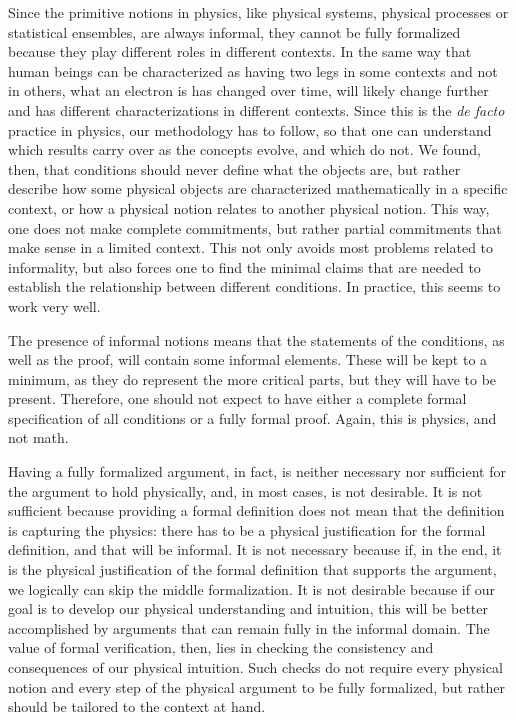 \documentclass[entropy,article,submit,moreauthors]{Definitions/mdpi}
\begin{document}
Since the primitive notions in physics, like physical systems, physical processes or statistical ensembles, are always informal, they cannot be fully formalized because they play different roles in different contexts. In the same way that human beings can be characterized as having two legs in some contexts and not in others, what an electron is has changed over time, will likely change further and has different characterizations in different contexts. Since this is the \textit{de facto} practice in physics, our methodology has to follow, so that one can understand which results carry over as the concepts evolve, and which do not. We found, then, that conditions should never define what the objects are, but rather describe how some physical objects are characterized mathematically in a specific context, or how a physical notion relates to another physical notion. This way, one does not make complete commitments, but rather partial commitments that make sense in a limited context. This not only avoids most problems related to informality, but also forces one to find the minimal claims that are needed to establish the relationship between different conditions. In practice, this seems to work very well.

The presence of informal notions means that the statements of the conditions, as well as the proof, will contain some informal elements. These will be kept to a minimum, as they do represent the more critical parts, but they will have to be present. Therefore, one should not expect to have either a complete formal specification of all conditions or a fully formal proof. Again, this is physics, and not math.

Having a fully formalized argument, in fact, is neither necessary nor sufficient for the argument to hold physically, and, in most cases, is not desirable. It is not sufficient because providing a formal definition does not mean that the definition is capturing the physics: there has to be a physical justification for the formal definition, and that will be informal. It is not necessary because if, in the end, it is the physical justification of the formal definition that supports the argument, we logically can skip the middle formalization. It is not desirable because if our goal is to develop our physical understanding and intuition, this will be better accomplished by arguments that can remain fully in the informal domain. The value of formal verification, then, lies in checking the consistency and consequences of our physical intuition. Such checks do not require every physical notion and every step of the physical argument to be fully formalized, but rather should be tailored to the context at hand.
\end{document}
